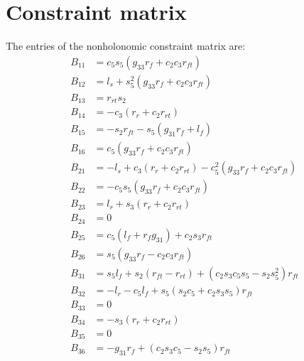 \documentclass[letterpaper,11pt]{article}
\begin{document}
\section{Constraint matrix}
\label{sec:constraint_matrix}
The entries of the nonholonomic constraint matrix are:
\begin{align*}
  B_{11} & = c_5 s_5(g_{33} r_f + c_2 c_3 r_{ft}) \\
  B_{12} & = l_s + s_5^2(g_{33} r_f + c_2 c_3 r_{ft}) \\
  B_{13} & = r_{rt} s_2 \\
  B_{14} & = -c_3 (r_r + c_2 r_{rt}) \\
  B_{15} & =   -s_2 r_{ft} - s_5 (g_{31} r_f + l_f) \\
  B_{16} & = c_5(g_{33} r_f + c_2 c_3 r_{ft})\\
  B_{21} & = -l_s + c_3(r_r + c_2 r_{rt}) - c_5^2(g_{33} r_f + c_2 c_3 r_{ft})\\
  B_{22} & =  - c_5 s_5(g_{33} r_f + c_2 c_3 r_{ft}) \\
  B_{23} & = l_r + s_3 (r_r  + c_2 r_{rt}) \\
  B_{24} & = 0 \\
  B_{25} & = c_5 (l_f + r_f g_{31}) + c_2 s_3 r_{ft} \\
  B_{26} & = s_5(g_{33} r_f - c_2 c_3 r_{ft}) \\
  B_{31} & = s_5 l_f + s_2 (r_{ft} - r_{rt}) + (c_2 s_3 c_5 s_5 - s_2 s_5^2) r_{ft}\\
  B_{32} & =  -l_r - c_5 l_f + s_5 (s_2 c_5 + c_2 s_3 s_5) r_{ft} \\
  B_{33} & =  0 \\
  B_{34} & =  -s_3 (r_r + c_2 r_{rt}) \\
  B_{35} & =  0 \\
  B_{36} & =  -g_{31} r_f + (c_2 s_3 c_5 - s_2 s_5) r_{ft}
\end{align*}


\begin{comment}
Here is the B matrix, but it is too wide to fit in portrait mode.
\begin{align*}
  \left[
  \begin{array}{cccccc}
    c_5 s_5(g_{33} r_f + c_2 c_3 r_{ft}) &
    l_s + s_5^2(g_{33} r_f + c_2 c_3 r_{ft}) &
    r_{rt} s_2 &
    -c_3 (r_r + c_2 r_{rt}) &
    -s_2 r_{ft} - s_5 (g_{31} r_f + l_f) &
    c_5(g_{33} r_f + c_2 c_3 r_{ft})
    \\
    -l_s + c_3(r_r + c_2 r_{rt}) - c_5^2(g_{33} r_f + c_2 c_3 r_{ft}) &
    - c_5 s_5(g_{33} r_f + c_2 c_3 r_{ft}) &
    l_r + s_3 (r_r  + c_2 r_{rt}) &
    0 &
    c_5 (l_f + r_f g_{31}) + c_2 s_3 r_{ft} &
    s_5(g_{33} r_f - c_2 c_3 r_{ft})
    \\
    s_5 l_f + s_2 (r_{ft} - r_{rt}) + (c_2 s_3 c_5 s_5 - s_2 s_5^2) r_{ft} &
    -l_r - c_5 l_f + s_5 (s_2 c_5 + c_2 s_3 s_5) r_{ft} &
    0 &
    -s_3 (r_r + c_2 r_{rt}) &
    0 &
    -g_{31} r_f + (c_2 s_3 c_5 - s_2 s_5) r_{ft}
  \end{array}
  \right]
\end{align*}
\end{comment}




\end{document}
